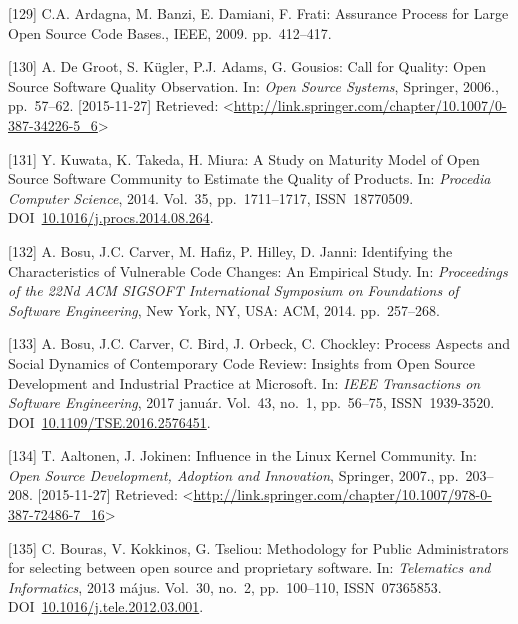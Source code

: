 \documentclass[12pt,magyar,a4paper,oneside]{scrreprt}
\newenvironment{cslreferences}%
  {}%
  {\par}
\begin{document}
\begin{cslreferences}
\leavevmode\hypertarget{ref-ardagna_assurance_2009}{}%
{[}129{]} C.A. Ardagna, M. Banzi, E. Damiani, F. Frati: Assurance
Process for Large Open Source Code Bases., IEEE, 2009. pp.~412--417.

\leavevmode\hypertarget{ref-de_groot_call_2006}{}%
{[}130{]} A. De Groot, S. Kügler, P.J. Adams, G. Gousios: Call for
Quality: Open Source Software Quality Observation. In: \emph{Open Source
Systems}, Springer, 2006., pp.~57--62. {[}2015-11-27{]} Retrieved:
\textless{}\url{http://link.springer.com/chapter/10.1007/0-387-34226-5_6}\textgreater{}

\leavevmode\hypertarget{ref-kuwata_study_2014}{}%
{[}131{]} Y. Kuwata, K. Takeda, H. Miura: A Study on Maturity Model of
Open Source Software Community to Estimate the Quality of Products. In:
\emph{Procedia Computer Science}, 2014. Vol.~35, pp.~1711--1717,
ISSN~18770509.
DOI~\href{https://doi.org/10.1016/j.procs.2014.08.264}{10.1016/j.procs.2014.08.264}.

\leavevmode\hypertarget{ref-bosu_identifying_2014}{}%
{[}132{]} A. Bosu, J.C. Carver, M. Hafiz, P. Hilley, D. Janni:
Identifying the Characteristics of Vulnerable Code Changes: An Empirical
Study. In: \emph{Proceedings of the 22Nd ACM SIGSOFT International
Symposium on Foundations of Software Engineering}, New York, NY, USA:
ACM, 2014. pp.~257--268.

\leavevmode\hypertarget{ref-bosu_process_2017}{}%
{[}133{]} A. Bosu, J.C. Carver, C. Bird, J. Orbeck, C. Chockley: Process
Aspects and Social Dynamics of Contemporary Code Review: Insights from
Open Source Development and Industrial Practice at Microsoft. In:
\emph{IEEE Transactions on Software Engineering}, 2017 január. Vol.~43,
no.~1, pp.~56--75, ISSN~1939-3520.
DOI~\href{https://doi.org/10.1109/TSE.2016.2576451}{10.1109/TSE.2016.2576451}.

\leavevmode\hypertarget{ref-aaltonen_influence_2007}{}%
{[}134{]} T. Aaltonen, J. Jokinen: Influence in the Linux Kernel
Community. In: \emph{Open Source Development, Adoption and Innovation},
Springer, 2007., pp.~203--208. {[}2015-11-27{]} Retrieved:
\textless{}\url{http://link.springer.com/chapter/10.1007/978-0-387-72486-7_16}\textgreater{}

\leavevmode\hypertarget{ref-bouras_methodology_2013}{}%
{[}135{]} C. Bouras, V. Kokkinos, G. Tseliou: Methodology for Public
Administrators for selecting between open source and proprietary
software. In: \emph{Telematics and Informatics}, 2013 május. Vol.~30,
no.~2, pp.~100--110, ISSN~07365853.
DOI~\href{https://doi.org/10.1016/j.tele.2012.03.001}{10.1016/j.tele.2012.03.001}.


\end{cslreferences}
\end{document}
